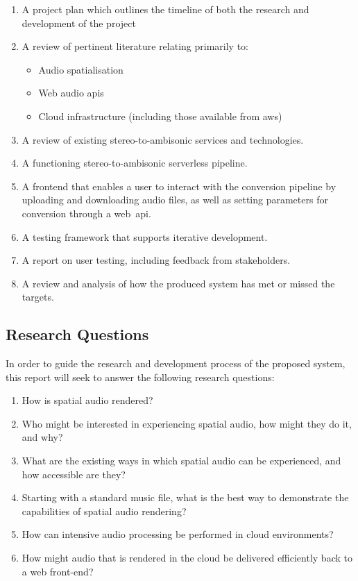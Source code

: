 \begin{enumerate}
    \item A project plan which outlines the timeline of both the research and development of the project
    \item A review of pertinent literature relating primarily to:
    \begin{itemize}
        \item Audio spatialisation
        \item Web audio \glspl{api}
        \item Cloud infrastructure (including those available from \gls{aws})
    \end{itemize}
    \item A review of existing stereo-to-ambisonic services and technologies.
    \item A functioning stereo-to-ambisonic serverless pipeline.
    \item A frontend that enables a user to interact with the conversion pipeline by uploading and downloading audio files, as well as setting parameters for conversion through a web~\gls{api}.
    \item A testing framework that supports iterative development.
    \item A report on user testing, including feedback from stakeholders.
    \item A review and analysis of how the produced system has met or missed the targets.
\end{enumerate}

\subsection{Research Questions}\label{subsec:research-questions}

In order to guide the research and development process of the proposed system, this report will seek to answer the following research questions:

\begin{enumerate}
    \item How is spatial audio rendered?
    \item Who might be interested in experiencing spatial audio, how might they do it, and why?
    \item What are the existing ways in which spatial audio can be experienced, and how accessible are they?
    \item Starting with a standard music file, what is the best way to demonstrate the capabilities of spatial audio rendering?
    \item How can intensive audio processing be performed in cloud environments?
    \item How might audio that is rendered in the cloud be delivered efficiently back to a web front-end?

\end{enumerate}